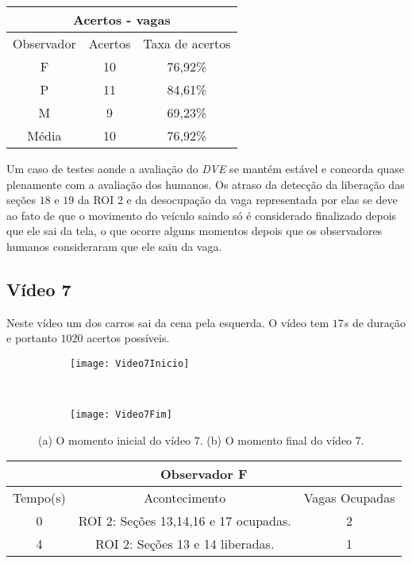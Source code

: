 \begin{center}
\begin{tabular}{|c||c||c|}
\hline
\multicolumn{3}{|c|}{Acertos - vagas}  \\ \hline \hline
Observador & Acertos & Taxa de acertos \\ \hline
F & 10 & 76,92\% \\  \hline
P & 11 & 84,61\% \\ \hline
M & 9 & 69,23\% \\ \hline
Média & 10 & 76,92\% \\
\hline
\end{tabular}
\end{center}


Um caso de testes aonde a avaliação do \textit{DVE} se mantém estável e concorda quase plenamente com a avaliação dos humanos. Os atraso da detecção da liberação das seções $18$ e $19$ da ROI $2$ e da desocupação da vaga representada por elas se deve ao fato de que o movimento do veículo saindo só é considerado finalizado depois que ele sai da tela, o que ocorre alguns momentos depois que os observadores humanos consideraram que ele saiu da vaga.

\subsection{Vídeo 7}

Neste vídeo um dos carros sai da cena pela esquerda. O vídeo tem $17s$ de duração e portanto $1020$ acertos possíveis.

\begin{figure}[!h]
\centering
\begin{subfigure}{.5\textwidth}
\centering
\texttt{[image: Video7Inicio]}
\caption{}
\end{subfigure}\
\begin{subfigure}{.5\textwidth}
\centering
\texttt{[image: Video7Fim]}
\caption{}
\end{subfigure}
\centering
\caption{(a) O momento inicial do vídeo 7. (b) O momento final do vídeo 7.}%
\label{}%
\end{figure}

\begin{center}
\begin{tabular}{|c||c||c|}
\hline
\multicolumn{3}{|c|}{Observador F}  \\ \hline \hline
Tempo(s) & Acontecimento & Vagas Ocupadas \\ \hline
0 & ROI 2: Seções 13,14,16 e 17 ocupadas. & 2 \\ \hline
4 & ROI 2: Seções 13 e 14 liberadas. & 1 \\
\hline
\end{tabular}
\end{center}

